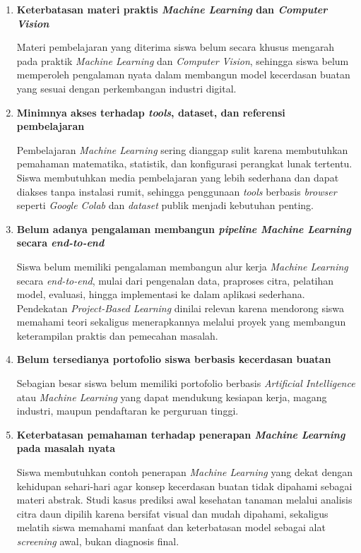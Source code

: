 \begin{enumerate}[leftmargin=*, label=\arabic*.]
    \item \textbf{Keterbatasan materi praktis \textit{Machine Learning} dan \textit{Computer Vision}}

    Materi pembelajaran yang diterima siswa belum secara khusus mengarah pada praktik \textit{Machine Learning} dan \textit{Computer Vision}, sehingga siswa belum memperoleh pengalaman nyata dalam membangun model kecerdasan buatan yang sesuai dengan perkembangan industri digital.

    \item \textbf{Minimnya akses terhadap \textit{tools}, dataset, dan referensi pembelajaran}

    Pembelajaran \textit{Machine Learning} sering dianggap sulit karena membutuhkan pemahaman matematika, statistik, dan konfigurasi perangkat lunak tertentu. Siswa membutuhkan media pembelajaran yang lebih sederhana dan dapat diakses tanpa instalasi rumit, sehingga penggunaan \textit{tools} berbasis \textit{browser} seperti \textit{Google Colab} dan \textit{dataset} publik menjadi kebutuhan penting.

    \item \textbf{Belum adanya pengalaman membangun \textit{pipeline Machine Learning} secara \textit{end-to-end}}

    Siswa belum memiliki pengalaman membangun alur kerja \textit{Machine Learning} secara \textit{end-to-end}, mulai dari pengenalan data, praproses citra, pelatihan model, evaluasi, hingga implementasi ke dalam aplikasi sederhana. Pendekatan \textit{Project-Based Learning} dinilai relevan karena mendorong siswa memahami teori sekaligus menerapkannya melalui proyek yang membangun keterampilan praktis dan pemecahan masalah.

    \item \textbf{Belum tersedianya portofolio siswa berbasis kecerdasan buatan}

    Sebagian besar siswa belum memiliki portofolio berbasis \textit{Artificial Intelligence} atau \textit{Machine Learning} yang dapat mendukung kesiapan kerja, magang industri, maupun pendaftaran ke perguruan tinggi.

    \item \textbf{Keterbatasan pemahaman terhadap penerapan \textit{Machine Learning} pada masalah nyata}

    Siswa membutuhkan contoh penerapan \textit{Machine Learning} yang dekat dengan kehidupan sehari-hari agar konsep kecerdasan buatan tidak dipahami sebagai materi abstrak. Studi kasus prediksi awal kesehatan tanaman melalui analisis citra daun dipilih karena bersifat visual dan mudah dipahami, sekaligus melatih siswa memahami manfaat dan keterbatasan model sebagai alat \textit{screening} awal, bukan diagnosis final.
\end{enumerate}
